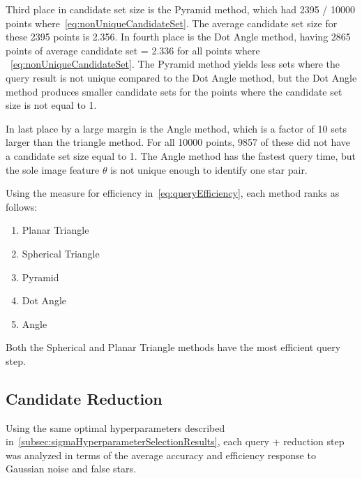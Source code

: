 Third place in candidate set size is the Pyramid method, which had 2395 / 10000 points
where~\autoref{eq:nonUniqueCandidateSet}.
The average candidate set size for these 2395 points is 2.356.
In fourth place is the Dot Angle method, having 2865 points of average candidate set = 2.336 for all points where
~\autoref{eq:nonUniqueCandidateSet}.
The Pyramid method yields less sets where the query result is not unique compared to the Dot Angle method, but the
Dot Angle method produces smaller candidate sets for the points where the candidate set size is not equal to 1.

In last place by a large margin is the Angle method, which is a factor of 10 sets larger than the triangle method.
For all 10000 points, 9857 of these did not have a candidate set size equal to 1.
The Angle method has the fastest query time, but the sole image feature $\theta$ is not unique enough to identify one
star pair.

Using the measure for efficiency in~\autoref{eq:queryEfficiency}, each method ranks as follows:
\begin{multicols}{2}
    \begin{enumerate}
        \item Planar Triangle
        \item Spherical Triangle
        \item Pyramid
        \item Dot Angle
        \item Angle
    \end{enumerate}
\end{multicols}

Both the Spherical and Planar Triangle methods have the most efficient query step.

\subsection{Candidate Reduction}\label{subsec:candidateReductionResults}
Using the same optimal hyperparameters described in~\autoref{subsec:sigmaHyperparameterSelectionResults}, each query +
reduction step was analyzed in terms of the average accuracy and efficiency response to Gaussian noise and false stars.

